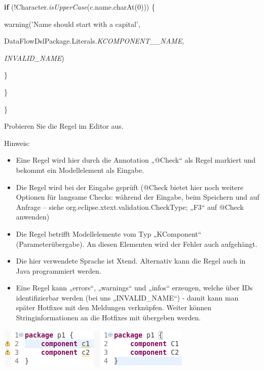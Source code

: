 \documentclass[a4]{article}
\providecommand{\tightlist}{%
  \setlength{\itemsep}{0pt}\setlength{\parskip}{0pt}}
\begin{document}
\textbf{if} (!Character.\emph{isUpperCase}(c.name.charAt(0))) \{

warning('Name should start with a capital',

DataFlowDslPackage.Literals.\emph{KCOMPONENT\_\_NAME},

\emph{INVALID\_NAME})

\}

\}

\}

Probieren Sie die Regel im Editor aus.

Hinweis:

\begin{itemize}
\tightlist
\item
  Eine Regel wird hier durch die Annotation „@Check`` als Regel markiert
  und bekommt ein Modellelement als Eingabe.
\item
  Die Regel wird bei der Eingabe geprüft (@Check bietet hier noch
  weitere Optionen für langsame Checks: während der Eingabe, beim
  Speichern und auf Anfrage -- siehe
  org.eclipse.xtext.validation.CheckType; „F3`` auf @Check anwenden)
\item
  Die Regel betrifft Modellelemente vom Typ „KComponent``
  (Parameterübergabe). An diesen Elementen wird der Fehler auch
  aufgehängt.
\item
  Die hier verwendete Sprache ist Xtend. Alternativ kann die Regel auch
  in Java programmiert werden.
\item
  Eine Regel kann „errors``, „warnings`` und „infos`` erzeugen, welche
  über IDs identifizierbar werden (bei uns „INVALID\_NAME``) - damit
  kann man später Hotfixes mit den Meldungen verknüpfen. Weiter können
  Stringinformationen an die Hotfixes mit übergeben werden.
\end{itemize}

\includegraphics[width=1.84370in,height=0.75000in]{./Pictures/10000201000000B1000000483B963938C77E8851.png}\includegraphics[width=1.81260in,height=0.76020in]{./Pictures/10000201000000AE00000049360C389AF76C863A.png}
\end{document}
